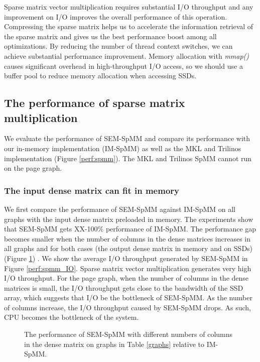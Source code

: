 Sparse matrix vector multiplication requires substantial I/O throughput and
any improvement on I/O improves the overall performance of this operation.
Compressing the sparse matrix helps us to accelerate the information retrieval
of the sparse matrix and gives us the best performance boost among all
optimizations. By reducing the number of thread context switches, we can
achieve substantial performance improvement. Memory allocation with
\textit{mmap()} causes significant overhead in high-throughput I/O access,
so we should use a buffer pool to reduce memory allocation when accessing SSDs.

\subsection{The performance of sparse matrix multiplication}

We evaluate the performance of SEM-SpMM and compare its performance with
our in-memory implementation (IM-SpMM) as well as the MKL and Trilinos
implementation (Figure \ref{perf:spmm}). The MKL and Trilinos SpMM cannot run
on the page graph.

\subsubsection{The input dense matrix can fit in memory}

We first compare the performance of SEM-SpMM against IM-SpMM on all graphs with
the input dense matrix preloaded in memory. The experiments show that
SEM-SpMM gets XX-100\% performance of IM-SpMM. The performance gap becomes
smaller when the number of columns in the dense matrices increases in all graphs
and for both cases (the output dense matrix in memory and on SSDs) (Figure
\ref{perf:spmm_comp}) .
We show the average I/O throughput generated by SEM-SpMM in
Figure \ref{perf:spmm_IO}. Sparse matrix vector multiplication generates very high I/O
throughput. For the page graph, when the number of columns in the dense matrices
is small, the I/O throughput gets close to the bandwidth of the SSD array, which
suggests that I/O be the bottleneck of SEM-SpMM. As the number of columns increase,
the I/O throughput
caused by SEM-SpMM drops. As such, CPU becomes the bottleneck of the system.

\begin{figure}
	\begin{center}
		\footnotesize
		
		\caption{The performance of SEM-SpMM with different numbers of columns
			in the dense matrix on graphs in Table \ref{graphs} relative to IM-SpMM.}
		\label{perf:spmm_comp}
	\end{center}
\end{figure}


